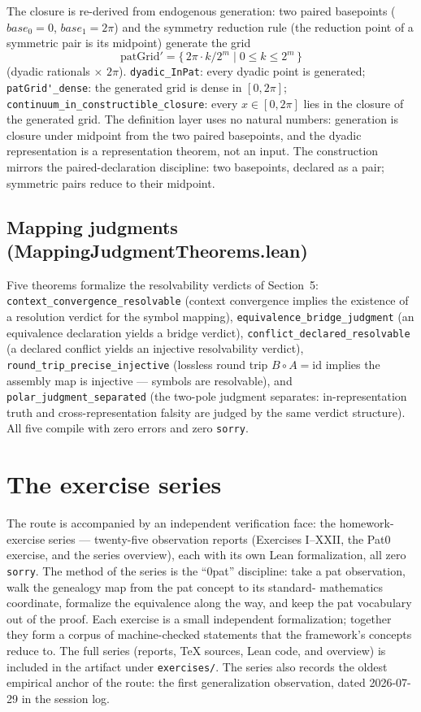 \documentclass[sigplan,10pt,anonymous,review]{acmart}
\begin{document}
The closure is re-derived from endogenous generation: two paired
basepoints ($base_0 = 0$, $base_1 = 2\pi$) and the symmetry reduction
rule (the reduction point of a symmetric pair is its midpoint)
generate the grid
\[
  \mathrm{patGrid}' = \big\{\, 2\pi \cdot k / 2^m \;\big|\; 0 \le k
  \le 2^m \,\big\}
\]
(dyadic rationals $\times$ $2\pi$). \verb|dyadic_InPat|: every dyadic
point is generated; \verb|patGrid'_dense|: the generated grid is dense
in $[0, 2\pi]$; \verb|continuum_in_constructible_closure|: every $x
\in [0, 2\pi]$ lies in the closure of the generated grid. The
definition layer uses no natural numbers: generation is closure under
midpoint from the two paired basepoints, and the dyadic representation
is a representation theorem, not an input. The construction mirrors
the paired-declaration discipline: two basepoints, declared as a pair;
symmetric pairs reduce to their midpoint.

\subsection{Mapping judgments (MappingJudgmentTheorems.lean)}

Five theorems formalize the resolvability verdicts of Section~5:
\verb|context_convergence_resolvable| (context convergence implies the
existence of a resolution verdict for the symbol mapping),
\verb|equivalence_bridge_judgment| (an equivalence declaration yields a
bridge verdict), \verb|conflict_declared_resolvable| (a declared
conflict yields an injective resolvability verdict),
\verb|round_trip_precise_injective| (lossless round trip $B \circ A =
\mathrm{id}$ implies the assembly map is injective --- symbols are
resolvable), and \verb|polar_judgment_separated| (the two-pole
judgment separates: in-representation truth and cross-representation
falsity are judged by the same verdict structure). All five compile
with zero errors and zero \texttt{sorry}.

\section{The exercise series}

The route is accompanied by an independent verification face: the
homework-exercise series --- twenty-five observation reports
(Exercises I--XXII, the Pat0 exercise, and the series overview), each
with its own Lean formalization, all zero \texttt{sorry}. The method
of the series is the ``0pat'' discipline: take a pat observation,
walk the genealogy map from the pat concept to its standard-
mathematics coordinate, formalize the equivalence along the way, and
keep the pat vocabulary out of the proof. Each exercise is a small
independent formalization; together they form a corpus of
machine-checked statements that the framework's concepts reduce to.
The full series (reports, TeX sources, Lean code, and overview) is
included in the artifact under \texttt{exercises/}. The series also
records the oldest empirical anchor of the route: the first
generalization observation, dated 2026-07-29 in the session log.
\end{document}

